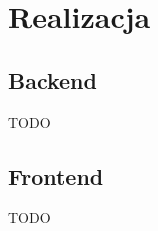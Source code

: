 
\chapter{Realizacja}
\label{ch:realizacja}

\section{Backend}
\label{sec:backend}

TODO

\section{Frontend}
\label{sec:frontend}

TODO
